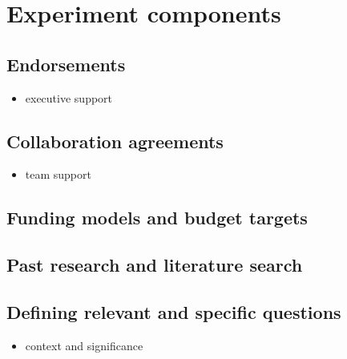\documentclass[]{book}
\providecommand{\tightlist}{%
  \setlength{\itemsep}{0pt}\setlength{\parskip}{0pt}}
\begin{document}
\hypertarget{experiment-components}{%
\chapter{Experiment components}\label{experiment-components}}

\hypertarget{endorsements}{%
\section{Endorsements}\label{endorsements}}

\begin{itemize}
\tightlist
\item
  executive support
\end{itemize}

\hypertarget{collaboration-agreements}{%
\section{Collaboration agreements}\label{collaboration-agreements}}

\begin{itemize}
\tightlist
\item
  team support
\end{itemize}

\hypertarget{funding-models-and-budget-targets}{%
\section{Funding models and budget targets}\label{funding-models-and-budget-targets}}

\hypertarget{past-research-and-literature-search}{%
\section{Past research and literature search}\label{past-research-and-literature-search}}

\hypertarget{defining-relevant-and-specific-questions}{%
\section{Defining relevant and specific questions}\label{defining-relevant-and-specific-questions}}

\begin{itemize}
\tightlist
\item
  context and significance
\end{itemize}
\end{document}
